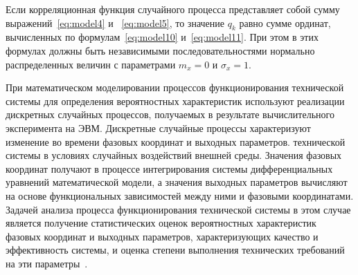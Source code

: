 Если корреляционная функция случайного процесса представляет собой
сумму выражений~\ref{eq:model4} и ~\ref{eq:model5}, то значение $q_k$ равно сумме ординат, вычисленных
по формулам~\ref{eq:model10} и~\ref{eq:model11}. При этом в этих формулах должны быть
независимыми последовательностями нормально распределенных величин с
параметрами $m_x = 0$ и $\sigma_x = 1$.

При математическом моделировании процессов функционирования
технической системы для определения вероятностных характеристик
используют реализации дискретных случайных процессов, получаемых в
результате вычислительного эксперимента на ЭВМ. Дискретные случайные
процессы характеризуют изменение во времени фазовых координат и выходных
параметров. технической системы в условиях случайных воздействий внешней
среды. Значения фазовых координат получают в процессе интегрирования
системы дифференциальных уравнений математической модели, а значения
выходных параметров вычисляют на основе функциональных зависимостей
между ними и фазовыми координатами. Задачей анализа процесса
функционирования технической системы в этом случае является получение
статистических оценок вероятностных характеристик фазовых координат и
выходных параметров, характеризующих качество и эффективность системы, и
оценка степени выполнения технических требований на эти параметры~\cite{modeling:2004}.

